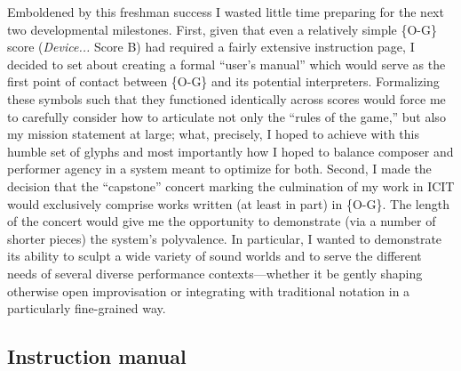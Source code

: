
    Emboldened by this freshman success I wasted little time preparing for the next two developmental milestones. First, given that even a relatively simple \{O-G\} score (\textit{Device...} Score B) had required a fairly extensive instruction page, I decided to set about creating a formal ``user's manual'' which would serve as the first point of contact between \{O-G\} and its potential interpreters. Formalizing these symbols such that they functioned identically across scores would force me to carefully consider how to articulate not only the ``rules of the game,'' but also my mission statement at large; what, precisely, I hoped to achieve with this humble set of glyphs and most importantly how I hoped to balance composer and performer agency in a system meant to optimize for both. Second, I made the decision that the ``capstone'' concert marking the culmination of my work in ICIT would exclusively comprise works written (at least in part) in \{O-G\}. The length of the concert would give me the opportunity to demonstrate (via a number of shorter pieces) the system's polyvalence. In particular, I wanted to demonstrate its ability to sculpt a wide variety of sound worlds and to serve the different needs of several diverse performance contexts---whether it be gently shaping otherwise open improvisation or integrating with traditional notation in a particularly fine-grained way. 

    \subsection{Instruction manual}
    \label{sec:instruction-manual}

